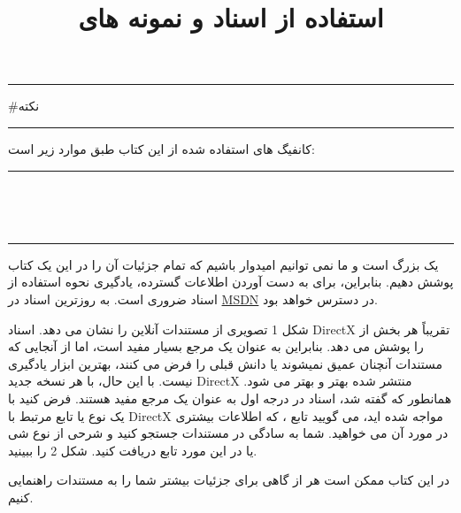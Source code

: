 \newpage
\rule{\textwidth}{0.5pt}
{\LARGE \#نکته\\}
\rule{\textwidth}{0.5pt}
{  \large
کانفیگ های استفاده شده از این کتاب طبق موارد زیر است:
\rule{\textwidth}{0.5pt}
} \\[25pt]
 
\title{
    \LARGE
    \textbf{استفاده از اسناد  و نمونه های }
}
\\ \rule{\textwidth}{0.5pt}
{  \large
{} یک  بزرگ است و ما نمی توانیم امیدوار باشیم که تمام جزئیات آن را در این یک کتاب پوشش دهیم.
بنابراین، برای به دست آوردن اطلاعات گسترده، یادگیری نحوه استفاده از اسناد  ضروری است.
به روزترین اسناد در \href{https://msdn.microsoft.com/en-us/library/windows/desktop/dn899121%28v=vs.85%29.aspx}{MSDN}
در دسترس خواهد بود.

شکل 1 تصویری از مستندات آنلاین را نشان می دهد.
اسناد DirectX تقریباً هر بخش از  را پوشش می دهد.
بنابراین به عنوان یک مرجع بسیار مفید است، اما از آنجایی که مستندات آنچنان عمیق نمیشوند یا دانش قبلی را فرض می کنند، بهترین ابزار یادگیری نیست. با این حال، با هر نسخه جدید DirectX منتشر شده بهتر و بهتر می شود.
همانطور که گفته شد، اسناد در درجه اول به عنوان یک مرجع مفید هستند.
فرض کنید با یک نوع یا تابع مرتبط با DirectX مواجه شده اید، می گویید تابع ، که اطلاعات بیشتری در مورد آن می خواهید.
شما به سادگی در مستندات جستجو کنید و شرحی از نوع شی یا در این مورد تابع دریافت کنید. شکل 2 را ببینید.

در این کتاب ممکن است هر از گاهی برای جزئیات بیشتر شما را به مستندات راهنمایی کنیم.

}
